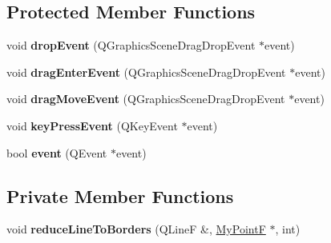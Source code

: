\subsection*{Protected Member Functions}
\begin{DoxyCompactItemize}
\item 
\hypertarget{class_my_drop_graphics_scene_a1a5dd8b0ac8aa55645d1d8c919451350}{}void {\bfseries drop\+Event} (Q\+Graphics\+Scene\+Drag\+Drop\+Event $\ast$event)\label{class_my_drop_graphics_scene_a1a5dd8b0ac8aa55645d1d8c919451350}

\item 
\hypertarget{class_my_drop_graphics_scene_a050aa1d5a7861ad4f320da82219a63d2}{}void {\bfseries drag\+Enter\+Event} (Q\+Graphics\+Scene\+Drag\+Drop\+Event $\ast$event)\label{class_my_drop_graphics_scene_a050aa1d5a7861ad4f320da82219a63d2}

\item 
\hypertarget{class_my_drop_graphics_scene_a407f26d50aa080e00f1097ffee0f41ce}{}void {\bfseries drag\+Move\+Event} (Q\+Graphics\+Scene\+Drag\+Drop\+Event $\ast$event)\label{class_my_drop_graphics_scene_a407f26d50aa080e00f1097ffee0f41ce}

\item 
\hypertarget{class_my_drop_graphics_scene_a856ec4eddc556b20abf3831b0ca3910a}{}void {\bfseries key\+Press\+Event} (Q\+Key\+Event $\ast$event)\label{class_my_drop_graphics_scene_a856ec4eddc556b20abf3831b0ca3910a}

\item 
\hypertarget{class_my_drop_graphics_scene_af8d211f3518dcc347f80eaebfee8a09a}{}bool {\bfseries event} (Q\+Event $\ast$event)\label{class_my_drop_graphics_scene_af8d211f3518dcc347f80eaebfee8a09a}

\end{DoxyCompactItemize}
\subsection*{Private Member Functions}
\begin{DoxyCompactItemize}
\item 
\hypertarget{class_my_drop_graphics_scene_ade89f2b11675821eec338ffdcff948f5}{}void {\bfseries reduce\+Line\+To\+Borders} (Q\+Line\+F \&, \hyperlink{class_my_point_f}{My\+Point\+F} $\ast$, int)\label{class_my_drop_graphics_scene_ade89f2b11675821eec338ffdcff948f5}

\end{DoxyCompactItemize}
